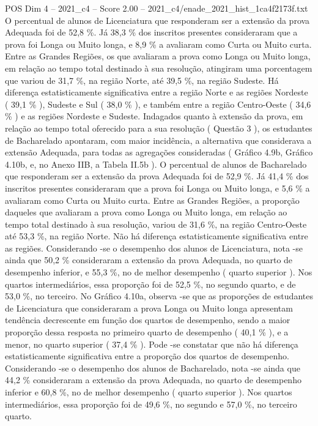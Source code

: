 \begin{textsample}{POS Dim 4 – 2021\_c4 – Score 2.00 – 2021\_c4/enade\_2021\_hist\_1ca4f2173f.txt}
O percentual de alunos de Licenciatura que responderam ser a extensão da prova Adequada foi de 52,8 \%.
Já 38,3 \% dos inscritos presentes consideraram que a prova foi Longa ou Muito longa, e 8,9 \% a avaliaram como Curta ou Muito curta.
Entre as Grandes Regiões, os que avaliaram a prova como Longa ou Muito longa, em relação ao tempo total destinado à sua resolução, atingiram uma porcentagem que variou de 31,7 \%, na região Norte, até 39,5 \%, na região Sudeste.
Há diferença estatisticamente significativa entre a região Norte e as regiões Nordeste ( 39,1 \% ), Sudeste e Sul ( 38,0 \% ), e também entre a região Centro-Oeste ( 34,6 \% ) e as regiões Nordeste e Sudeste.
Indagados quanto à extensão da prova, em relação ao tempo total oferecido para a sua resolução ( Questão 3 ), os estudantes de Bacharelado apontaram, com maior incidência, a alternativa que considerava a extensão Adequada, para todas as agregações consideradas ( Gráfico 4.9b, Gráfico 4.10b, e, no Anexo IIB, a Tabela II.5b ).
O percentual de alunos de Bacharelado que responderam ser a extensão da prova Adequada foi de 52,9 \%.
Já 41,4 \% dos inscritos presentes consideraram que a prova foi Longa ou Muito longa, e 5,6 \% a avaliaram como Curta ou Muito curta.
Entre as Grandes Regiões, a proporção daqueles que avaliaram a prova como Longa ou Muito longa, em relação ao tempo total destinado à sua resolução, variou de 31,6 \%, na região Centro-Oeste até 53,3 \%, na região Norte.
Não há diferença estatisticamente significativa entre as regiões.
Considerando -se o desempenho dos alunos de Licenciatura, nota -se ainda que 50,2 \% consideraram a extensão da prova Adequada, no quarto de desempenho inferior, e 55,3 \%, no de melhor desempenho ( quarto superior ).
Nos quartos intermediários, essa proporção foi de 52,5 \%, no segundo quarto, e de 53,0 \%, no terceiro.
No Gráfico 4.10a, observa -se que as proporções de estudantes de Licenciatura que consideraram a prova Longa ou Muito longa apresentam tendência decrescente em função dos quartos de desempenho, sendo a maior proporção dessa resposta no primeiro quarto de desempenho ( 40,1 \% ), e a menor, no quarto superior ( 37,4 \% ).
Pode -se constatar que não há diferença estatisticamente significativa entre a proporção dos quartos de desempenho.
Considerando -se o desempenho dos alunos de Bacharelado, nota -se ainda que 44,2 \% consideraram a extensão da prova Adequada, no quarto de desempenho inferior e 60,8 \%, no de melhor desempenho ( quarto superior ).
Nos quartos intermediários, essa proporção foi de 49,6 \%, no segundo e 57,0 \%, no terceiro quarto.

\end{textsample}
